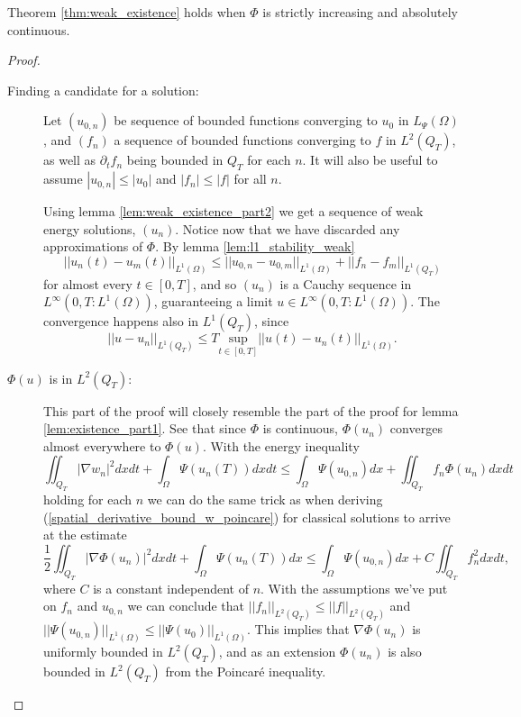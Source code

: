 \documentclass[11pt, a4paper]{article}
\begin{document}
\begin{lemma}
Theorem \ref{thm:weak_existence} holds when $\Phi$ is strictly increasing and absolutely continuous.
\end{lemma}
\begin{proof}



\begin{description}
\item[Finding a candidate for a solution:]
Let $(u_{0,n})$ be sequence of bounded functions converging to $u_0$ in $L_{\Psi}(\Omega)$, and $(f_n)$ a sequence of bounded functions converging to $f$ in $L^2(Q_T)$, as well as $\partial_t f_n$ being bounded in $Q_T$ for each $n$. It will also be useful to assume $|u_{0,n}| \leq |u_0|$ and $|f_n| \leq |f|$ for all $n$.

Using lemma \ref{lem:weak_existence_part2} we get a sequence of weak energy solutions, $(u_n)$. Notice now that we have discarded any approximations of $\Phi$. By lemma \ref{lem:l1_stability_weak}
\begin{equation*}
||u_n(t) - u_m(t)||_{L^1(\Omega)} \leq ||u_{0,n} - u_{0,m}||_{L^1(\Omega)} + ||f_n - f_m||_{L^1(Q_T)}
\end{equation*}
for almost every $t \in [0,T]$, and so $(u_n)$ is a Cauchy sequence in $L^\infty(0,T: L^1(\Omega))$, guaranteeing a limit $u \in L^\infty(0,T: L^1(\Omega))$. The convergence happens also in $L^1(Q_T)$, since
\begin{equation*}
||u - u_n||_{L^1(Q_T)} \leq T\underset{t \in [0,T]}{\mathrm{sup}}||u(t) - u_n(t)||_{L^1(\Omega)}.
\end{equation*}

\item[$\Phi(u)$ is in $L^2(Q_T)$:]
This part of the proof will closely resemble the part of the proof for lemma \ref{lem:existence_part1}. See that since $\Phi$ is continuous, $\Phi(u_n)$ converges almost everywhere to $\Phi(u)$. With the energy inequality
\begin{equation*}
\iint_{Q_T} |\nabla w_n|^2dxdt + \int_{\Omega} \Psi(u_n(T))dxdt \leq \int_\Omega \Psi(u_{0,n})dx + \iint_{Q_T}f_n \Phi(u_n)dxdt
\end{equation*}
holding for each $n$ we can do the same trick as when deriving (\ref{spatial_derivative_bound_w_poincare}) for classical solutions to arrive at the estimate
\begin{equation}
\frac{1}{2}\iint_{Q_T}|\nabla \Phi(u_n)|^2 dxdt + \int_\Omega \Psi(u_n(T))dx \leq \int_\Omega \Psi(u_{0,n})dx + C\iint_{Q_T}f_n^2dxdt,
\end{equation}
where $C$ is a constant independent of $n$.
With the assumptions we've put on $f_n$ and $u_{0,n}$ we can conclude that $||f_n||_{L^2(Q_T)} \leq ||f||_{L^2(Q_T)}$ and $||\Psi(u_{0,n})||_{L^1(\Omega)} \leq ||\Psi(u_0)||_{L^1(\Omega)}$. This implies that $\nabla \Phi(u_n)$ is uniformly bounded in $L^2(Q_T)$, and as an extension $\Phi(u_n)$ is also bounded in $L^2(Q_T)$ from the Poincaré inequality.


\end{description}
\end{proof}
\end{document}
